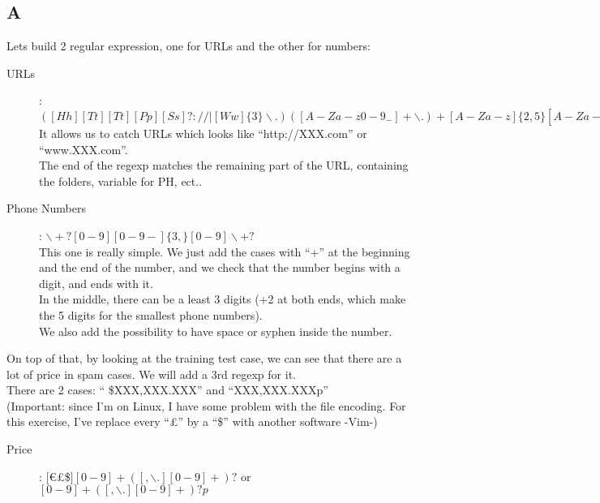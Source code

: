 \documentclass{article}
\begin{document}
        \subsection{A}
            Lets build 2 regular expression, one for URLs and the other for numbers:
            \begin{description}
                \item[URLs]: $([Hh][Tt][Tt][Pp][Ss]?://|[Ww]\{3\}\backslash .)([A-Za-z0-9_ -]+\backslash .)+[A-Za-z]\{2,5\}[A-Za-z0-9/_? = -]*$\\
                    It allows us to catch URLs which looks like ``http://XXX.com'' or ``www.XXX.com''.\\
                    The end of the regexp matches the remaining part of the URL, containing the folders, variable for PH, ect..
                \item[Phone Numbers]: $\backslash+?[0-9][0-9 -]\{3,\}[0-9]\backslash+?$\\
                    This one is really simple. We just add the cases with ``+'' at the beginning and the end of the number, and we check that the number begins with a digit, and ends with it.\\
                    In the middle, there can be a least 3 digits (+2 at both ends, which make the 5 digits for the smallest phone numbers).\\
                    We also add the possibility to have space or syphen inside the number.
            \end{description}
            On top of that, by looking at the training test case, we can see that there are a lot of price in spam cases. We will add a 3rd regexp for it.\\
            There are 2 cases: `` \$XXX,XXX.XXX'' and ``XXX,XXX.XXXp''\\
            (Important: since I'm on Linux, I have some problem with the file encoding. For this exercise, I've replace every ``£'' by a ``\$'' with another software -Vim-)
            \begin{description}
                \item[Price]: $[$\euro£\$$][0-9]+([,\backslash.][0-9]+)?$ or $[0-9]+([,\backslash.][0-9]+)?p$
            \end{description}
\end{document}
